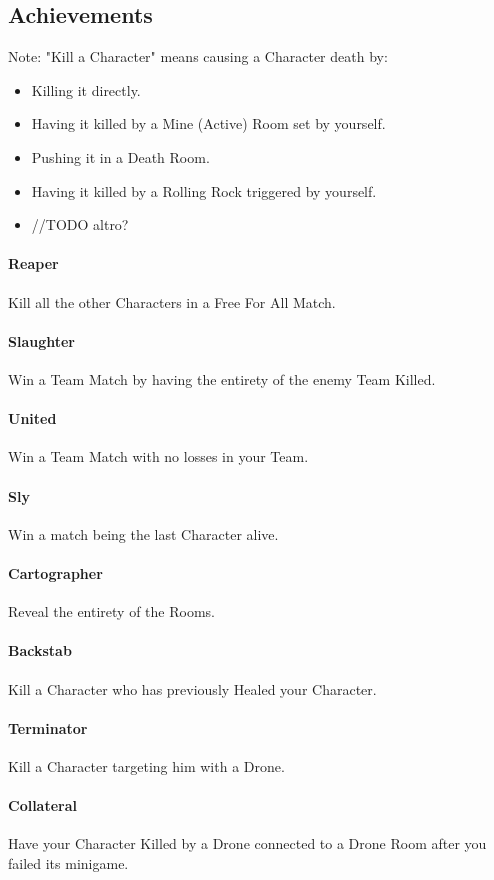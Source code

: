 \subsection{Achievements}

Note: "Kill a Character" means causing a Character death by:
\begin{itemize}
	\item Killing it directly.
	\item Having it killed by a Mine (Active) Room set by yourself.
	\item Pushing it in a Death Room.
	\item Having it killed by a Rolling Rock triggered by yourself.
	\item //TODO altro?
\end{itemize}

\paragraph{Reaper} Kill all the other Characters in a Free For All Match.
\paragraph{Slaughter} Win a Team Match by having the entirety of the enemy Team Killed.
\paragraph{United} Win a Team Match with no losses in your Team.
\paragraph{Sly} Win a match being the last Character alive.
\paragraph{Cartographer} Reveal the entirety of the Rooms.
\paragraph{Backstab} Kill a Character who has previously Healed your Character.

\paragraph{Terminator} Kill a Character targeting him with a Drone.
\paragraph{Collateral} Have your Character Killed by a Drone connected to a Drone Room after you failed its minigame.

